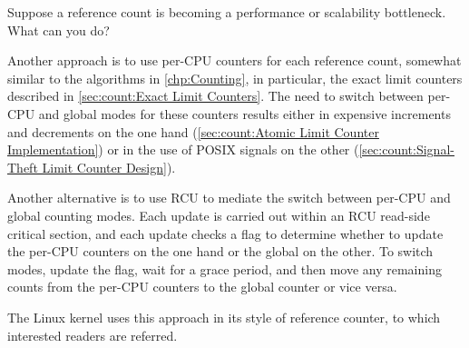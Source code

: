 Suppose a reference count is becoming a performance or scalability
bottleneck.
What can you do?

Another approach is to use per-CPU counters for each reference count,
somewhat similar to the algorithms in \cref{chp:Counting}, in particular,
the exact limit counters described in
\cref{sec:count:Exact Limit Counters}.
The need to switch between per-CPU and global modes for these counters
results either in expensive increments and decrements on the one hand
(\cref{sec:count:Atomic Limit Counter Implementation})
or in the use of POSIX signals on the other
(\cref{sec:count:Signal-Theft Limit Counter Design}).

Another alternative is to use RCU to mediate the switch between per-CPU
and global counting modes.
Each update is carried out within an RCU read-side critical section,
and each update checks a flag to determine whether to update the
per-CPU counters on the one hand or the global on the other.
To switch modes, update the flag, wait for a grace period, and then
move any remaining counts from the per-CPU counters to the global
counter or vice versa.

The Linux kernel uses this approach in its  style of
reference counter, to which interested readers are referred.

